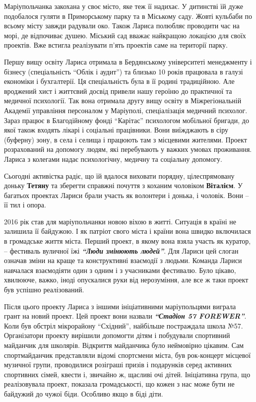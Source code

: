 
Маріупольчанка закохана у своє місто, яке теж її надихає. У дитинстві їй дуже
подобалося гуляти в Приморському парку та в Міському саду. Жовті кульбаби по
всьому місту завжди радували око. Також Лариса полюбляє проводити час на морі,
де відпочиває душею. Міський сад вважає найкращою локацією для своїх проектів.
Вже встигла реалізувати п'ять проектів саме на території парку.


Першу вищу освіту Лариса отримала в Бердянському університеті менеджменту і
бізнесу (спеціальність \enquote{Облік і аудит}) та близько 10 років працювала в галузі
економіки і бухгалтерії. Ця спеціальність була в її родині традиційною. Але
вроджений хист і життєвий досвід привели нашу героїню до практичної та медичної
психології. Так вона отримала другу вищу освіту в Міжрегіональній Академії
управління персоналом у Маріуполі, спеціалізація медичний психолог. Зараз
працює в Благодійному фонді \enquote{Карітас} психологом мобільної бригади, до якої
також входять лікарі і соціальні працівники. Вони виїжджають в сіру (буферну)
зону, в села і селища і працюють там з місцевими жителями. Проект розрахований
на допомогу людям, які перебувають у важких умовах проживання. Лариса з
колегами надає психологічну, медичну та соціальну допомогу.

Сьогодні активістка радіє, що їй вдалося виховати порядну, цілеспрямовану
доньку \textbf{Тетяну} та зберегти справжні почуття з коханим чоловіком \textbf{Віталієм}. У
багатьох проектах Лариси брали участь як волонтери і донька, і чоловік. Вони –
її тил і опора.


2016 рік став для маріупольчанки новою віхою в житті. Ситуація в країні не
залишила її байдужою. І як патріот свого міста і країни вона швидко включилася
в громадське життя міста. Перший проект, в якому вона взяла участь як куратор,
– фестиваль вуличної їжі \emph{\textbf{\enquote{Люди змінюють людей}}}. Для Лариси цей слоган означав
зміни на краще та конструктивні взаємодії з людьми. Команда Лариси навчалася
взаємодіяти один з одним і з учасниками фестивалю. Було цікаво, хвилююче,
важко, іноді опускалися руки від нерозуміння, але все ж таки проект був успішно
реалізований.

Після цього проекту Лариса з іншими ініціативними маріупольцями виграла грант
на новий проект. Цей проект вони назвали \emph{\textbf{\enquote{Стадіон 57 FOREWER}}}. Коли був
обстріл мікрорайону \enquote{Східний}, найбільше постраждала школа №57.
Організатори проекту вирішили допомогти дітям і побудували спортивний майданчик
для школярів.  Відкриття майданчика було неймовірно цікавим. Сам спортмайданчик
представляли відомі спортсмени міста, був рок-концерт місцевої музичної групи,
проводилися розіграші призів і подарунків серед активних спортивних сімей,
квести і, звичайно ж, щасливі очі дітей. Ініціативна група, що реалізовувала
проект, показала громадськості, що кожен з нас може бути не байдужий до чужої
біди. Особливо якщо в біді діти.

